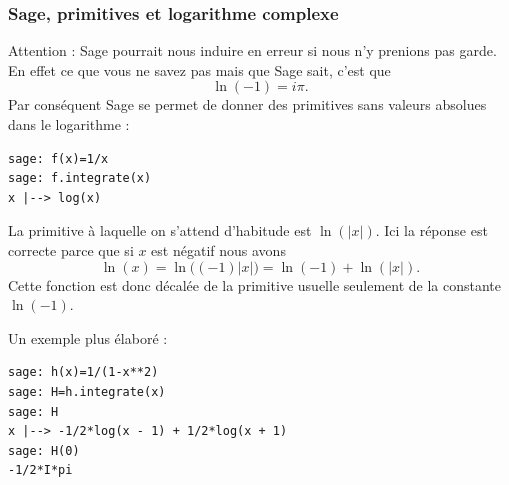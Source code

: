 \subsubsection{Sage, primitives et logarithme complexe}

\begin{normaltext}\label{ooOPWYooDDSZWx}

	Attention : Sage pourrait nous induire en erreur si nous n'y prenions pas garde. En effet ce que vous ne savez pas mais que Sage sait, c'est que
	\begin{equation}
		\ln(-1)=i\pi.
	\end{equation}
	Par conséquent Sage se permet de donner des primitives sans valeurs absolues dans le logarithme :
	\begin{verbatim}
sage: f(x)=1/x
sage: f.integrate(x)
x |--> log(x)
\end{verbatim}
	La primitive à laquelle on s'attend d'habitude est \( \ln(| x |)\). Ici la réponse est correcte parce que si \( x\) est négatif nous avons
	\begin{equation}
		\ln(x)=\ln\big( (-1)| x | \big)=\ln(-1)+\ln(| x |).
	\end{equation}
	Cette fonction est donc décalée de la primitive usuelle seulement de la constante \( \ln(-1)\).

	Un exemple plus élaboré :
	\begin{verbatim}
sage: h(x)=1/(1-x**2)
sage: H=h.integrate(x)
sage: H
x |--> -1/2*log(x - 1) + 1/2*log(x + 1)
sage: H(0)
-1/2*I*pi
\end{verbatim}
\end{normaltext}


